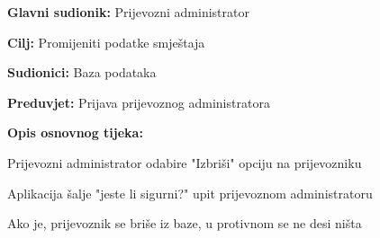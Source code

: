 			\noindent {}
			\begin{packed_item}
				
				\item \textbf{Glavni sudionik: }Prijevozni administrator
				\item  \textbf{Cilj:} Promijeniti podatke smještaja
				\item  \textbf{Sudionici:} Baza podataka
				\item  \textbf{Preduvjet:} Prijava prijevoznog administratora
				\item  \textbf{Opis osnovnog tijeka:}
				
				\item[] \begin{packed_enum}
					
					\item Prijevozni administrator odabire "Izbriši" opciju na prijevozniku
					\item Aplikacija šalje "jeste li sigurni?" upit prijevoznom administratoru
					\item Ako je, prijevoznik se briše iz baze, u protivnom se ne desi ništa
				\end{packed_enum}
				
			\end{packed_item}
			\eject
			\noindent {}
